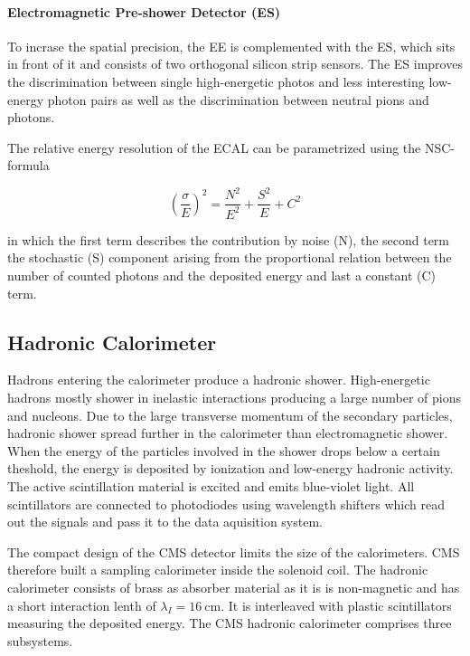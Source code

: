 \paragraph{Electromagnetic Pre-shower Detector (ES)} 
To incrase the spatial precision, the EE is complemented with the ES, which sits
in front of it and consists of two orthogonal silicon strip sensors. The ES
improves the discrimination between single high-energetic photos and less
interesting low-energy photon pairs as well as the discrimination between
neutral pions and photons.

The relative energy resolution of the ECAL can be parametrized using the NSC-formula

\begin{equation*}
    \left( \frac{\sigma}{E} \right)^2 = \frac{N^2}{E^2} + \frac{S^2}{E} + C^2
\end{equation*}

in which the first term describes the contribution by noise (N), the second
term the stochastic (S) component arising from the proportional relation between
the number of counted photons and the deposited energy and last a constant (C)
term.

\subsection{Hadronic Calorimeter}

Hadrons entering the calorimeter produce a hadronic shower. High-energetic
hadrons mostly shower in inelastic interactions producing a large number of pions
and nucleons. Due to the large transverse momentum of the secondary particles,
hadronic shower spread further in the calorimeter than electromagnetic shower.
When the energy of the particles involved in the shower drops below a certain
theshold, the energy is deposited by ionization and low-energy hadronic
activity. The active scintillation material is excited and emits blue-violet
light. All scintillators are connected to photodiodes using wavelength
shifters which read out the signals and pass it to the data aquisition system.

The compact design of the CMS detector limits the size of the calorimeters. CMS
therefore built a sampling calorimeter inside the solenoid coil. The hadronic
calorimeter consists of brass as absorber material as it is is non-magnetic and
has a short interaction lenth of $\lambda_I = \SI{16}{\centi\metre}$. It is
interleaved with plastic scintillators measuring the deposited energy. The CMS
hadronic calorimeter comprises three subsystems. 

